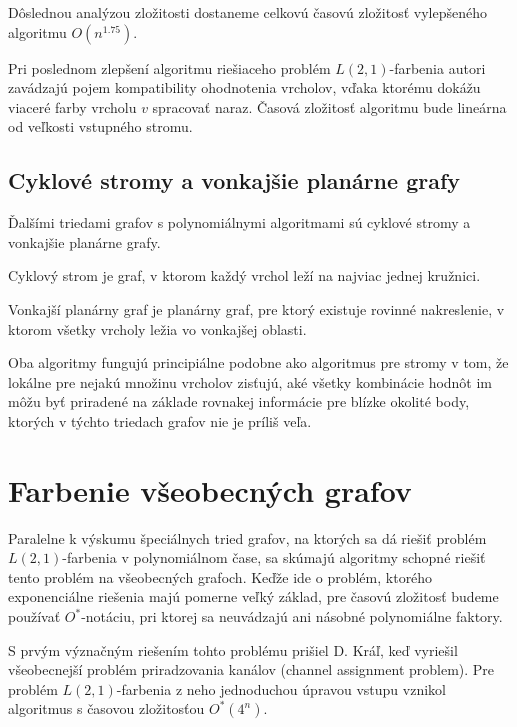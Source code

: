 Dôslednou analýzou 
zložitosti dostaneme celkovú časovú zložitosť vylepšeného algoritmu $O(n^{1.75})$\cite{chang_kuo_improv}.

Pri poslednom zlepšení algoritmu riešiaceho problém $L(2,1)$-farbenia autori zavádzajú
pojem kompatibility ohodnotenia vrcholov, vďaka ktorému dokážu viaceré farby vrcholu $v$
spracovať naraz. Časová zložitosť algoritmu bude lineárna od veľkosti vstupného stromu\cite{chang_kuo_linear}.

\subsection{Cyklové stromy a vonkajšie planárne grafy}

Ďalšími triedami grafov s polynomiálnymi algoritmami sú cyklové stromy\cite{kaktusy} a vonkajšie
planárne grafy\cite{outer_planar}.

\begin{defn}
    Cyklový strom je graf, v ktorom každý vrchol leží na najviac jednej kružnici.
\end{defn}

\begin{defn}
    Vonkajší planárny graf je planárny graf, pre ktorý existuje rovinné nakreslenie, v ktorom
    všetky vrcholy ležia vo vonkajšej oblasti.
\end{defn}

Oba algoritmy fungujú principiálne podobne ako algoritmus pre stromy v tom, že lokálne pre
nejakú množinu vrcholov zisťujú, aké všetky kombinácie hodnôt im môžu byť priradené na
základe rovnakej informácie pre blízke okolité body, ktorých v týchto triedach grafov nie je
príliš veľa.

\section{Farbenie všeobecných grafov}

Paralelne k výskumu špeciálnych tried grafov, na ktorých sa dá riešiť problém $L(2,1)$-farbenia
v polynomiálnom čase,
sa skúmajú algoritmy schopné riešiť tento problém na všeobecných grafoch. Keďže ide o problém,
ktorého exponenciálne riešenia majú pomerne veľký základ, pre časovú zložitosť budeme používať
$O^*$-notáciu, pri ktorej sa neuvádzajú ani násobné polynomiálne faktory.

S prvým význačným riešením tohto problému prišiel D. Kráľ, keď vyriešil všeobecnejší problém
priradzovania kanálov (channel assignment problem). Pre problém $L(2,1)$-farbenia z neho 
jednoduchou úpravou vstupu vznikol algoritmus s časovou zložitosťou $O^*(4^n)$\cite{kral_channel}.

